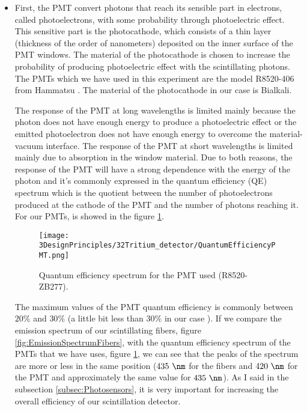 \begin{itemize}
\item{} First, the PMT convert photons that reach its sensible part in electrons, called photoelectrons, with some probability through photoelectric effect. This sensitive part is the photocathode, which consists of a thin layer (thickness of the order of nanometers) deposited on the inner surface of the PMT windows. The material of the photocathode is chosen to increase the probability of producing photoelectric effect with the scintillating photons. The PMTs which we have used in this experiment are the model R8520-406 from Hammatsu \cite{DataSheetPMTs}. The material of the photocathode in our case is Bialkali.

The response of the PMT at long wavelengths is limited mainly because the photon does not have enough energy to produce a photoelectric effect or the emitted photoelectron does not have enough energy to overcome the material-vacuum interface. The response of the PMT at short wavelengths is limited mainly due to absorption in the window material. Due to both reasons, the response of the PMT will have a strong dependence with the energy of the photon and it's commonly expressed in the quantum efficiency (QE) spectrum which is the quotient between the number of photoelectrons produced at the cathode of the PMT and the number of photons reaching it. For our PMTs, is showed in the figure \ref{fig:QuantumEfficiencyPMT}.

\begin{figure}[htbp]
\centering
\texttt{[image: 3DesignPrinciples/32Tritium\_detector/QuantumEfficiencyPMT.png]}
\caption{Quantum efficiency spectrum for the PMT used (R8520-ZB277).\label{fig:QuantumEfficiencyPMT}~\cite{DataSheetPMTs}}
\end{figure}

The maximum values of the PMT quantum efficiency is commonly between $20\%$ and $30\%$ \cite{Knoll} (a little bit less than $30\%$ in our case \cite{DataSheetPMTs}). If we compare the emission spectrum of our scintillating fibers, figure \ref{fig:EmissionSpectrumFibers}, with the quantum efficiency spectrum of the PMTs that we have uses, figure \ref{fig:QuantumEfficiencyPMT}, we can see that the peaks of the spectrum are more or less in the same position ($435~\nm$ for the fibers and $420~\nm$ for the PMT and approximately the same value for $435~\nm$). As I said in the subsection \ref{subsec:Photosensors}, it is very important for increasing the overall efficiency of our scintillation detector. 


\end{itemize}
